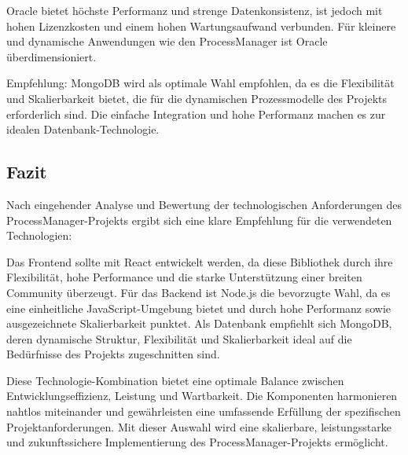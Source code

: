 Oracle bietet höchste Performanz und strenge Datenkonsistenz, ist jedoch mit hohen Lizenzkosten und einem hohen Wartungsaufwand verbunden. Für kleinere und dynamische Anwendungen wie den ProcessManager ist Oracle überdimensioniert.

Empfehlung: MongoDB wird als optimale Wahl empfohlen, da es die Flexibilität und Skalierbarkeit bietet, die für die dynamischen Prozessmodelle des Projekts erforderlich sind. Die einfache Integration und hohe Performanz machen es zur idealen Datenbank-Technologie.

\subsection{Fazit}
Nach eingehender Analyse und Bewertung der technologischen Anforderungen des ProcessManager-Projekts ergibt sich eine klare Empfehlung für die verwendeten Technologien:

Das Frontend sollte mit React entwickelt werden, da diese Bibliothek durch ihre Flexibilität, hohe Performance und die starke Unterstützung einer breiten Community überzeugt. Für das Backend ist Node.js die bevorzugte Wahl, da es eine einheitliche JavaScript-Umgebung bietet und durch hohe Performanz sowie ausgezeichnete Skalierbarkeit punktet. Als Datenbank empfiehlt sich MongoDB, deren dynamische Struktur, Flexibilität und Skalierbarkeit ideal auf die Bedürfnisse des Projekts zugeschnitten sind.

Diese Technologie-Kombination bietet eine optimale Balance zwischen Entwicklungseffizienz, Leistung und Wartbarkeit. Die Komponenten harmonieren nahtlos miteinander und gewährleisten eine umfassende Erfüllung der spezifischen Projektanforderungen. Mit dieser Auswahl wird eine skalierbare, leistungsstarke und zukunftssichere Implementierung des ProcessManager-Projekts ermöglicht.
